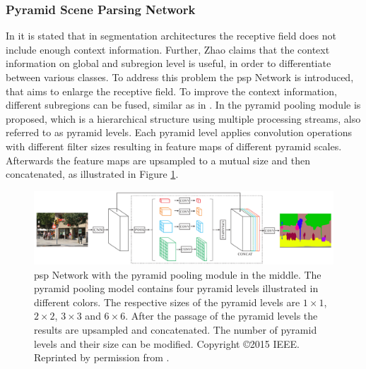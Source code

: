 \subsubsection{Pyramid Scene Parsing Network}
In \cite{Zhao17-PSP} it is stated that in segmentation architectures the receptive field does not include enough context information.
Further, Zhao claims that the context information on global and subregion level is useful, in order to differentiate between various classes.
To address this problem the \gls{psp} Network is introduced, that aims to enlarge the receptive field.
To improve the context information, different subregions can be fused, similar as in \cite{He15-SPP}.
In \cite{Zhao17-PSP} the pyramid pooling module is proposed, which is a hierarchical structure using multiple processing streams, also referred to as pyramid levels.
Each pyramid level applies convolution operations with different filter sizes resulting in feature maps of different pyramid scales.
Afterwards the feature maps are upsampled to a mutual size and then concatenated, as illustrated in Figure \ref{fig:ch2:sec2:psp}.
\begin{figure}
	\includegraphics[width=\linewidth]{figures/chap223_psp.png}
	\caption[Pyramid Scene Parsing Network]{
		\gls{psp} Network with the pyramid pooling module in the middle.
		The pyramid pooling model contains four pyramid levels illustrated in different colors.
		The respective sizes of the pyramid levels are $1 \times 1$, $2 \times 2$, $3 \times 3$ and  $6 \times 6$.
		After the passage of the pyramid levels the results are upsampled and concatenated.
		The number of pyramid levels and their size can be modified.
		Copyright \copyright 2015 IEEE. Reprinted by permission from \cite{Zhao17-PSP}.}
	\label{fig:ch2:sec2:psp}
\end{figure}



